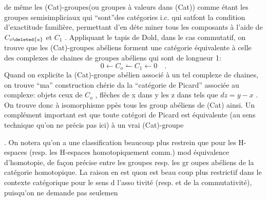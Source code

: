 de même les (Cat)-groupes(ou groupes à valeurs dans (Cat)) comme étant
les groupes semisimpliciaux qui ``sont''des catégories i.c. qui 
 satfont la condition d'exactitude familière, permettant d'en déte
miner tous les composants à l'aide de $C_{o\deleted{a}}$ et $C_1$ . Appliquant le tapis de
Dold, dans le cas commutatif, on trouve que les (Cat)-groupes abéliens
forment une catégorie équivalente à celle des complexes de chaines de
groupes abéliens qui sont de longueur 1:
\[ 0 \leftarrow C_o \leftharpoonup C_1 \leftarrow 0 \quad . \]
Quand on explicite la (Cat)-groupe abélien associé à un tel complexe de
chaines, on trouve ``ma'' construction chérie da la ``catégorie de Picard''
associée au complexe: objets ceux de $C_o$ , flêches de x dans y les z dans
tels que $dz = y-x$ . On trouve donc à isomorphisme ppès tous les group
abéliens de (Cat) ainsi. Un complément important est que toute catégori
de Picard est équivalente (au sens technique qu'on ne précis
pas ici) à  un vrai (Cat)-groupe  .
On notera qu'on a une  classification beaucoup plus restrein
que pour les H-espaces (resp. les H-espaces homotopiquement comm.) mod
équivalence d'homotopie, de façon précise entre les groupes resp. les gr
oupes abéliens de la catégorie homotopique. La raison en est quon est beau
coup plus restrictif dans le contexte catégorique pour le sens d l'asso
tivité (resp. et de la commutativité), puisqu'on ne demande pas seulemen
